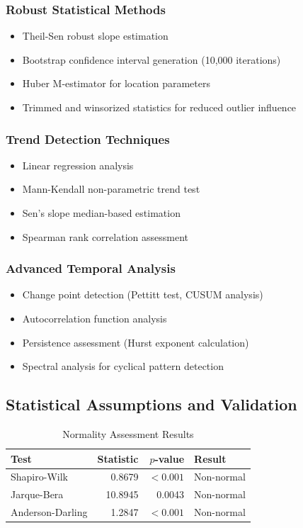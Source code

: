 \documentclass[12pt,a4paper]{article}
\newcommand{\pvalue}{$p$-value}
\begin{document}
\subsubsection{Robust Statistical Methods}
\begin{itemize}
    \item Theil-Sen robust slope estimation
    \item Bootstrap confidence interval generation (10,000 iterations) \cite{Huang2020BootstrappingClimate}
    \item Huber M-estimator for location parameters
    \item Trimmed and winsorized statistics for reduced outlier influence
\end{itemize}

\subsubsection{Trend Detection Techniques}
\begin{itemize}
    \item Linear regression analysis
    \item Mann-Kendall non-parametric trend test
    \item Sen's slope median-based estimation
    \item Spearman rank correlation assessment
\end{itemize}

\subsubsection{Advanced Temporal Analysis}
\begin{itemize}
    \item Change point detection (Pettitt test, CUSUM analysis) \cite{Wang2019CUSUMGlacier}
    \item Autocorrelation function analysis
    \item Persistence assessment (Hurst exponent calculation)
    \item Spectral analysis for cyclical pattern detection
\end{itemize}

\subsection{Statistical Assumptions and Validation}

\begin{table}[H]
\centering
\caption{Normality Assessment Results}
\label{tab:normality_tests}
\begin{tabular}{@{}lrrl@{}}
\toprule
\textbf{Test} & \textbf{Statistic} & \textbf{\pvalue} & \textbf{Result} \\
\midrule
Shapiro-Wilk & 0.8679 & $< 0.001$ & Non-normal \\
Jarque-Bera & 10.8945 & 0.0043 & Non-normal \\
Anderson-Darling & 1.2847 & $< 0.001$ & Non-normal \\
\bottomrule
\end{tabular}
\end{table}
\end{document}
